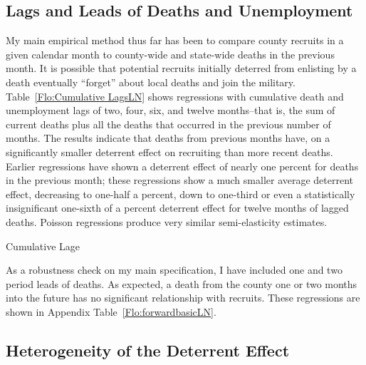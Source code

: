 \documentclass[12pt] {article}
\begin{document}
\subsection{Lags and Leads of Deaths and Unemployment\label{sub:Lags}}
My main empirical method thus far has been to compare county recruits
in a given calendar month to county-wide and state-wide deaths in
the previous month. It is possible that potential recruits initially
deterred from enlisting by a death eventually {}``forget'' about
local deaths and join the military. Table~\ref{Flo:Cumulative LagsLN}
shows regressions with cumulative death and unemployment lags
of two, four, six, and twelve months--that is, the sum of current
deaths plus all the deaths that occurred in the previous number of
months. The results indicate that deaths from previous months have,
on a significantly smaller deterrent effect on recruiting
than more recent deaths. Earlier regressions have shown a deterrent
effect of nearly one percent for deaths in the previous month; these
regressions show a much smaller average deterrent effect, decreasing
to one-half a percent, down to one-third or even a statistically insignificant
one-sixth of a percent deterrent effect for twelve months of lagged
deaths. Poisson regressions produce very similar semi-elasticity
estimates.

\begin{table}
\caption{Cumulative Lage}
\label{Flo:Cumulative LagsLN}
\scalebox{0.8}{}
\end{table}

As a robustness check on my main specification, I have included one and two period leads of deaths. As expected, a death from the county one or two months into the future has no significant relationship with recruits. These regressions are shown in Appendix Table~\ref{Flo:forwardbasicLN}. 

\subsection{Heterogeneity of the Deterrent Effect\label{sub:interactions}}
\end{document}
